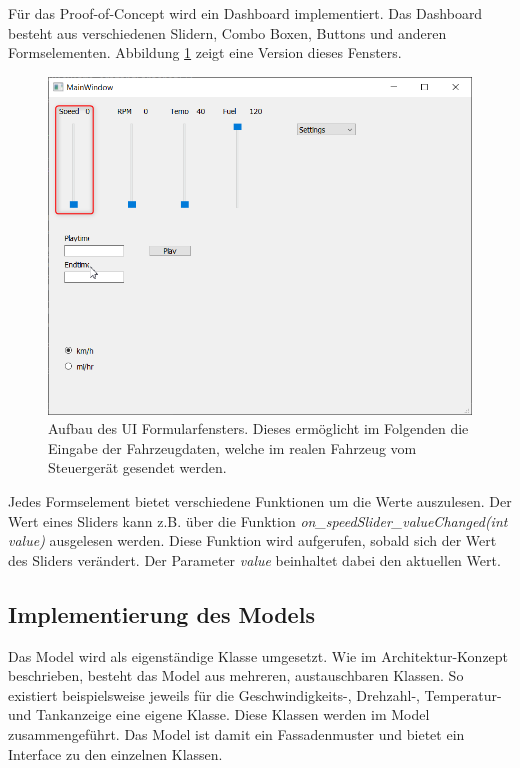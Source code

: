 Für das Proof-of-Concept wird ein Dashboard implementiert. Das Dashboard besteht aus verschiedenen Slidern, Combo Boxen, Buttons und anderen Formselementen. Abbildung \ref{fig:ui_window} zeigt eine Version dieses Fensters.\\

\begin{figure}[htb]
	\centering
	\includegraphics[width=\textwidth]{img/5_implementierung/ui_window}
	\caption[Aufbau des UI Formularfensters]{Aufbau des UI Formularfensters. Dieses ermöglicht im Folgenden die Eingabe der Fahrzeugdaten, welche im realen Fahrzeug vom Steuergerät gesendet werden.}
	\label{fig:ui_window}
\end{figure}

Jedes Formselement bietet verschiedene Funktionen um die Werte auszulesen. Der Wert eines Sliders kann z.B. über die Funktion \textit{on\_speedSlider\_valueChanged(int value)} ausgelesen werden. Diese Funktion wird aufgerufen, sobald sich der Wert des Sliders verändert. Der Parameter \textit{value} beinhaltet dabei den aktuellen Wert.\\

\subsection{Implementierung des Models}
Das Model wird als eigenständige Klasse umgesetzt. Wie im Architektur-Konzept beschrieben, besteht das Model aus mehreren, austauschbaren Klassen. So existiert beispielsweise jeweils für die Geschwindigkeits-, Drehzahl-, Temperatur- und Tankanzeige eine eigene Klasse. Diese Klassen werden im Model zusammengeführt. Das Model ist damit ein Fassadenmuster und bietet ein Interface zu den einzelnen Klassen.\\

